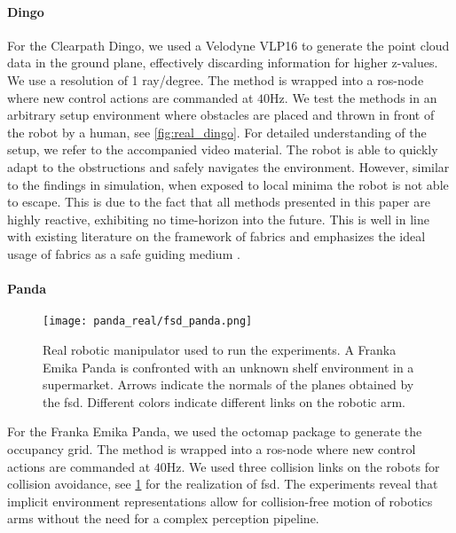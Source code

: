 \paragraph{Dingo}
For the Clearpath Dingo, we used a Velodyne
VLP16 to generate the point cloud data in the ground plane,
effectively discarding information for higher z-values. We
use a resolution of 1 ray/degree. The method is wrapped into
a ros-node where new control actions are commanded at
$40$Hz. We test the methods in an
arbitrary setup environment where obstacles are placed and
thrown in front of the robot by a human, see
\cref{fig:real_dingo}. For detailed understanding of
the setup, we refer to the accompanied video material. The
robot is able to quickly adapt to the obstructions and
safely navigates the environment. However, similar to the
findings in simulation, when exposed to local minima the
robot is not able to escape. This is due to the fact that
all methods presented in this paper are highly reactive, exhibiting
no time-horizon into the future. This is well in line with
existing literature on the framework of \ac{fabrics} and
emphasizes the ideal usage of \ac{fabrics} as a safe guiding
medium \cite{wyk2024geometric}.

\paragraph{Panda}
%
\begin{figure}
  \texttt{[image: panda\_real/fsd\_panda.png]}
  \caption{Real robotic manipulator used to run the experiments. A
    Franka Emika Panda is confronted with an unknown shelf
    environment in a supermarket. Arrows indicate the
    normals of the planes obtained by the \ac{fsd}.
    Different colors indicate different links on the robotic
    arm.
  }
  \label{fig:real_panda}
\end{figure}
%
For the Franka Emika Panda, we used the octomap package to
generate the occupancy grid. The method is wrapped into a
ros-node where new control actions are commanded at $40$Hz.
We used three collision links on the robots for collision
avoidance, see \cref{fig:real_panda} for the realization of
\ac{fsd}. The experiments reveal that implicit environment
representations allow for collision-free motion of robotics
arms without the need for a complex perception pipeline.

